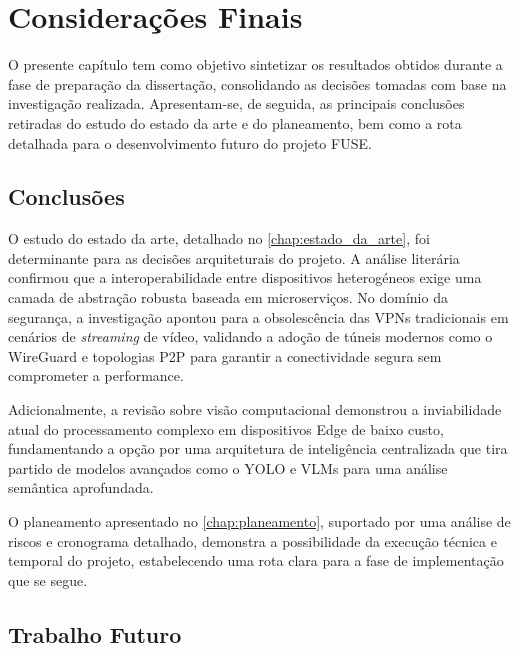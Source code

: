 
\chapter{Considerações Finais}
\label{chap:conclusoes}
O presente capítulo tem como objetivo sintetizar os resultados obtidos durante a fase de preparação da dissertação, consolidando as decisões tomadas com base na investigação realizada. Apresentam-se, de seguida, as principais conclusões retiradas do estudo do estado da arte e do planeamento, bem como a rota detalhada para o desenvolvimento futuro do projeto \gls{FUSE}.

\section{Conclusões}
\label{sec:conclusoes_finais}

O estudo do estado da arte, detalhado no \autoref{chap:estado_da_arte}, foi determinante para as decisões arquiteturais do projeto. A análise literária confirmou que a interoperabilidade entre dispositivos heterogéneos exige uma camada de abstração robusta baseada em microserviços. No domínio da segurança, a investigação apontou para a obsolescência das \glspl{VPN} tradicionais em cenários de \textit{streaming} de vídeo, validando a adoção de túneis modernos como o WireGuard e topologias \gls{P2P} para garantir a conectividade segura sem comprometer a performance. 

Adicionalmente, a revisão sobre visão computacional demonstrou a inviabilidade atual do processamento complexo em dispositivos Edge de baixo custo, fundamentando a opção por uma arquitetura de inteligência centralizada que tira partido de modelos avançados como o \gls{YOLO} e \glspl{VLM} para uma análise semântica aprofundada.

O planeamento apresentado no \autoref{chap:planeamento}, suportado por uma análise de riscos e cronograma detalhado, demonstra a possibilidade da execução técnica e temporal do projeto, estabelecendo uma rota clara para a fase de implementação que se segue.



\section{Trabalho Futuro}
\label{sec:trabalho_futuro}

